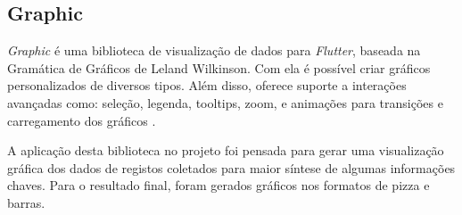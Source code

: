 \subsection{Graphic}

\textit{Graphic} é uma biblioteca de visualização de dados para \textit{Flutter}, 
baseada 
na Gramática de Gráficos de Leland Wilkinson. Com ela é possível criar gráficos 
personalizados de diversos tipos. Além disso, oferece suporte 
a interações avançadas como: seleção, legenda, tooltips, zoom, e animações 
para transições e carregamento dos gráficos \cite{graphic_flutter}.

A aplicação desta biblioteca no projeto foi pensada para gerar uma 
visualização gráfica dos dados de registos coletados para maior síntese de
algumas informações chaves.
Para o resultado final, foram gerados gráficos nos formatos de pizza e barras.
